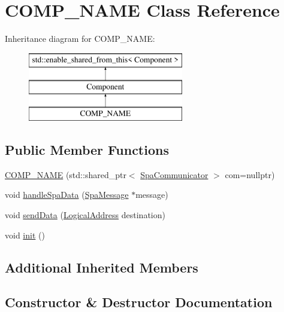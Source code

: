 \hypertarget{classCOMP__NAME}{}\section{C\+O\+M\+P\+\_\+\+N\+A\+ME Class Reference}
\label{classCOMP__NAME}
Inheritance diagram for C\+O\+M\+P\+\_\+\+N\+A\+ME\+:\begin{figure}[H]
\begin{center}
\leavevmode
\includegraphics[height=3.000000cm]{classCOMP__NAME}
\end{center}
\end{figure}
\subsection*{Public Member Functions}
\begin{DoxyCompactItemize}
\item 
\hyperlink{classCOMP__NAME_a5e5144cab5540c8102c3c03a0ee0a768}{C\+O\+M\+P\+\_\+\+N\+A\+ME} (std\+::shared\+\_\+ptr$<$ \hyperlink{classSpaCommunicator}{Spa\+Communicator} $>$ com=nullptr)
\item 
void \hyperlink{classCOMP__NAME_a8c1d575e72e948f84891244ca3bee646}{handle\+Spa\+Data} (\hyperlink{structSpaMessage}{Spa\+Message} $\ast$message)
\item 
void \hyperlink{classCOMP__NAME_ac981fe25a24ee01c160d08f0a970fab1}{send\+Data} (\hyperlink{structLogicalAddress}{Logical\+Address} destination)
\item 
void \hyperlink{classCOMP__NAME_abfae2e6e6f24cee4c16800385a103ca8}{init} ()
\end{DoxyCompactItemize}
\subsection*{Additional Inherited Members}


\subsection{Constructor \& Destructor Documentation}
\mbox{\label{classCOMP__NAME_a5e5144cab5540c8102c3c03a0ee0a768}} 
